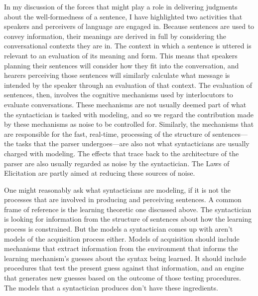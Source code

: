 {In my discussion of the forces that might play a role in delivering judgments about the well-formedness of a sentence, I have highlighted two activities that speakers and perceivers of language are engaged in. Because sentences are used to convey information, their meanings are derived in full by considering the conversational contexts they are in. The context in which a sentence is uttered is relevant to an evaluation of its meaning and form. This means that speakers planning their sentences will consider how they fit into the conversation, and hearers perceiving those sentences will similarly calculate what message is intended by the speaker through an evaluation of that context. The evaluation of sentences, then, involves the cognitive mechanisms used by interlocutors to evaluate conversations. These mechanisms are not usually deemed part of what the syntactician is tasked with modeling, and so we regard the contribution made by these mechanisms as noise to be controlled for. Similarly, the mechanisms that are responsible for the fast, real-time, processing of the structure of sentences---the tasks that the parser undergoes---are also not what syntacticians are usually charged with modeling. The effects that trace back to the architecture of the parser are also usually regarded as noise by the syntactician. The Laws of Elicitation are partly aimed at reducing these sources of noise.

One might reasonably ask what syntacticians are modeling, if it is not the processes that are involved in producing and perceiving sentences. A common frame of reference is the learning theoretic one discussed above. The syntactician is looking for information from the structure of sentences about how the learning process is constrained. But the models a syntactician comes up with aren't models of the acquisition process either. Models of acquisition should include mechanisms that extract information from the environment that informs the learning mechanism's guesses about the syntax being learned. It should include procedures that test the present guess against that information, and an engine that generates new guesses based on the outcome of those testing procedures. The models that a syntactician produces don't have these ingredients.

}
